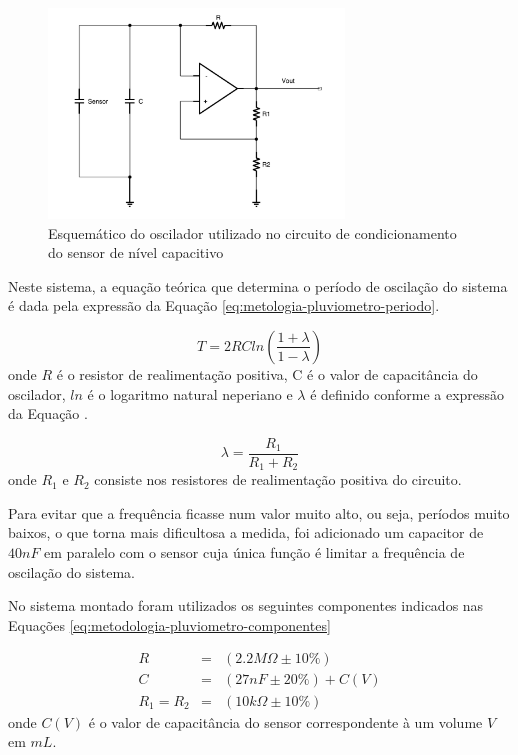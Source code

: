 \documentclass[a4paper]{instrumentacao}
\begin{document}
\begin{figure}[H]
	\centering
	\includegraphics[width=0.7\textwidth]{Circuitos/Pluviometro-Oscilador.pdf}
	\caption{Esquemático do oscilador utilizado no circuito de condicionamento do sensor de nível capacitivo}
	\label{fig:metodologia-capacitivo-oscilador}
\end{figure}

Neste sistema, a equação teórica que determina o período de oscilação do sistema é dada pela expressão da Equação \ref{eq:metologia-pluviometro-periodo}.

\begin{equation}
	T = 2 R C ln \left(\frac{1+\lambda}{1-\lambda}\right)
	\label{eq:metologia-pluviometro-periodo}
\end{equation}
\noindent onde $R$ é o resistor de realimentação positiva, C é o valor de capacitância do oscilador, $ln$ é o logaritmo natural neperiano e $\lambda$ é definido conforme a expressão da Equação \label{eq:metologia-pluviometro-periodo-2}.

\begin{equation}
	\lambda = \frac{R_1}{R_1 + R_2}
	\label{eq:metologia-pluviometro-periodo-2}
\end{equation}
\noindent onde $R_1$ e $R_2$ consiste nos resistores de realimentação positiva do circuito.

Para evitar que a frequência ficasse num valor muito alto, ou seja, períodos muito baixos, o que torna mais dificultosa a medida, foi adicionado um capacitor de $40 nF$ em paralelo com o sensor cuja única função é limitar a frequência de oscilação do sistema.

No sistema montado foram utilizados os seguintes componentes indicados nas Equações \ref{eq:metodologia-pluviometro-componentes}

\begin{eqnarray}
	R &=& (2.2 M\Omega \pm 10\%) 		\label{eq:metodologia-pluviometro-componentes}					\\
	C &=& (27 nF \pm 20\%) + C(V) 		\nonumber			\\
	R_1 = R_2 &=& (10 k\Omega \pm 10\%)	\nonumber
\end{eqnarray}
\noindent onde $C(V)$ é o valor de capacitância do sensor correspondente à um volume $V$ em $mL$.
\end{document}
